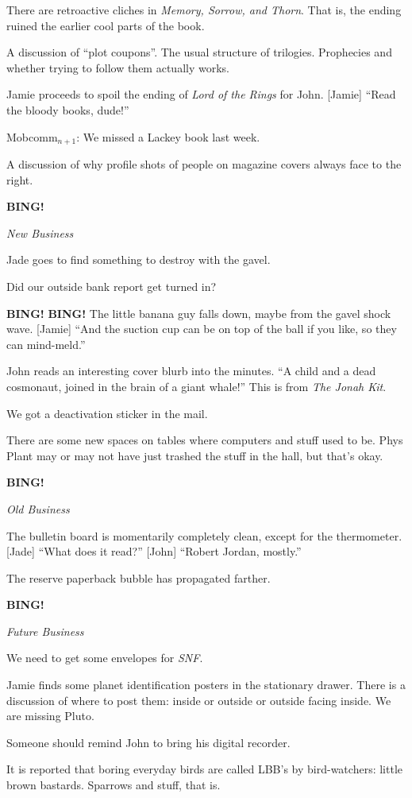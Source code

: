 \documentclass[12pt]{article}
\newcommand{\bing}{{\bf BING!} }
\newcommand{\goto}[1]{\bing \vskip 12pt \centerline{{\em{#1}}}}
\begin{document}
There are retroactive cliches in {\em Memory, Sorrow, and Thorn}.
That is, the ending ruined the earlier cool parts of the book.

A discussion of ``plot coupons''.  The usual structure of trilogies.
Prophecies and whether trying to follow them actually works.

Jamie proceeds to spoil the ending of {\em Lord of the Rings} for
John.  [Jamie] ``Read the bloody books, dude!''

Mobcomm$_{n+1}$: We missed a Lackey book last week.

A discussion of why profile shots of people on magazine covers always
face to the right.

\goto{New Business}

Jade goes to find something to destroy with the gavel.

Did our outside bank report get turned in?

\bing \bing  The little banana guy falls down, maybe from the gavel
shock wave.  [Jamie] ``And the suction cup can be on top of the ball
if you like, so they can mind-meld.''

John reads an interesting cover blurb into the minutes.  ``A child
and a dead cosmonaut, joined in the brain of a giant whale!''  This
is from {\em The Jonah Kit}.

We got a deactivation sticker in the mail.

There are some new spaces on tables where computers and stuff used
to be.  Phys Plant may or may not have just trashed the stuff in the
hall, but that's okay.

\goto{Old Business}

The bulletin board is momentarily completely clean, except for the
thermometer.  [Jade] ``What does it read?''  [John] ``Robert Jordan,
mostly.''

The reserve paperback bubble has propagated farther.

\goto{Future Business}

We need to get some envelopes for {\em SNF}.

Jamie finds some planet identification posters in the stationary
drawer.  There is a discussion of where to post them: inside or outside
or outside facing inside.  We are missing Pluto.

Someone should remind John to bring his digital recorder.

It is reported that boring everyday birds are called LBB's by bird-watchers:
little brown bastards.  Sparrows and stuff, that is.
\end{document}
